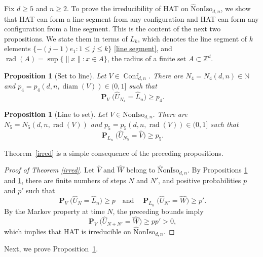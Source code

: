 \documentclass[11pt,reqno]{amsart}
\newtheorem{proposition}[lemma]{Proposition}
\theoremstyle{definition}
\numberwithin{equation}{section}
\newcommand{\N}{\mathbb{N}}
\newcommand{\Z}{\mathbb{Z}}
\newcommand{\1}{\mathbf{1}}
\DeclareMathOperator{\rad}{rad}
\DeclareMathOperator{\PP}{\mathbf{P}}
\DeclareMathOperator{\diam}{diam}
\newcommand{\noniso}{\mathrm{NonIso}}
\newcommand{\wtnoniso}{\mathrm{\wt{N}onIso}}
\newcommand{\wt}{\widehat}
\DeclareMathOperator{\Conf}{\mathrm{Conf}}
\begin{document}
Fix $d \geq 5$ and $n \geq 2$. To prove the irreducibility of HAT on $\wtnoniso_{d,n}$, we show that HAT can form a line segment from any configuration and HAT can form any configuration from a line segment. This is the content of the next two propositions. We state them in terms of $L_k$, which denotes the line segment of $k$ elements $\{-(j-1) e_1: 1 \leq j \leq k\}$ \eqref{line segment}, and $\rad (A) = \sup \{ \|x\|: x \in A\}$, the radius of a finite set $A \subset \Z^d$.

\begin{proposition}[Set to line]\label{cor line}
Let $V \in \Conf_{d,n}$. There are $N_4 = N_4 (d,n) \in \N$ and $p_4 = p_4 (d,n,\diam(V)) \in (0,1]$ such that
\begin{equation}\label{eq cor line}
\PP_{V} \big( \wt{U}_{N_4} = \wt{L}_n \big) \geq p_4.
\end{equation}
\end{proposition}

\begin{proposition}[Line to set]\label{prop line to set}
Let $V \in \noniso_{d,n}$. There are $N_5 = N_5 (d,n,\rad (V))$ and $p_5 = p_5 (d,n,\rad (V)) \in (0,1]$ such that
\begin{equation}\label{line to set}
\PP_{L_n} \big( \wt U_{N_5} = \wt V \big) \geq p_5.
\end{equation}
\end{proposition}

Theorem~\ref{irred} is a simple consequence of the preceding propositions. 

\begin{proof}[Proof of Theorem \ref{irred}]
Let $\wt V$ and $\wt W$ belong to $\wtnoniso_{d,n}$. By Propositions \ref{cor line} and \ref{prop line to set}, there are finite numbers of steps $N$ and $N'$, and positive probabilities $p$ and $p'$ such that
\[ 
\PP_{V} \big( \wt{U}_{N} = \wt{L}_n \big) \geq p \quad \text{and} \quad \PP_{L_n} \big( \wt{U}_{N'} = \wt{W} \big) \geq p'.
\]
By the Markov property at time $N$, the preceding bounds imply 
\[ 
\PP_V \big( \wt{U}_{N+N'} = \wt{W} \big) \geq p p' > 0,
\] 
which implies that HAT is irreducible on $\wtnoniso_{d,n}$.
\end{proof}

Next, we prove Proposition~\ref{cor line}.
\end{document}
